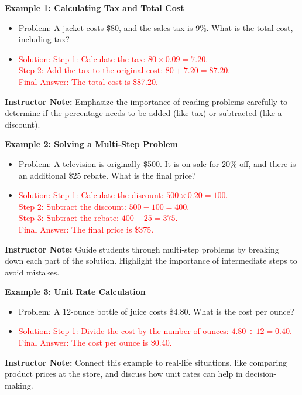 \documentclass[12pt]{article}
\begin{document}
\vspace{1em}

\begin{tcolorbox}[colframe=black!60, colback=white, 
coltitle=black, colbacktitle=black!15, fonttitle=\bfseries\Large, 
title=Examples, halign title=center, left=10pt, right=10pt, top=10pt, bottom=15pt]
\textbf{Example 1: Calculating Tax and Total Cost}
\begin{itemize}
    \item Problem: A jacket costs \$80, and the sales tax is 9\%. What is the total cost, including tax?
    \item \textcolor{red}{Solution: Step 1: Calculate the tax: \( 80 \times 0.09 = 7.20 \). \\ Step 2: Add the tax to the original cost: \( 80 + 7.20 = 87.20 \). \\ Final Answer: The total cost is \$87.20.}
\end{itemize}

{\color{blue} \textbf{Instructor Note:} Emphasize the importance of reading problems carefully to determine if the percentage needs to be added (like tax) or subtracted (like a discount).}

\textbf{Example 2: Solving a Multi-Step Problem}
\begin{itemize}
    \item Problem: A television is originally \$500. It is on sale for 20\% off, and there is an additional \$25 rebate. What is the final price?
    \item \textcolor{red}{Solution: Step 1: Calculate the discount: \( 500 \times 0.20 = 100 \). \\ Step 2: Subtract the discount: \( 500 - 100 = 400 \). \\ Step 3: Subtract the rebate: \( 400 - 25 = 375 \). \\ Final Answer: The final price is \$375.}
\end{itemize}

{\color{blue} \textbf{Instructor Note:} Guide students through multi-step problems by breaking down each part of the solution. Highlight the importance of intermediate steps to avoid mistakes.}

\textbf{Example 3: Unit Rate Calculation}
\begin{itemize}
    \item Problem: A 12-ounce bottle of juice costs \$4.80. What is the cost per ounce?
    \item \textcolor{red}{Solution: Step 1: Divide the cost by the number of ounces: \( 4.80 \div 12 = 0.40 \). \\ Final Answer: The cost per ounce is \$0.40.}
\end{itemize}

{\color{blue} \textbf{Instructor Note:} Connect this example to real-life situations, like comparing product prices at the store, and discuss how unit rates can help in decision-making.}
\end{tcolorbox}
\end{document}
